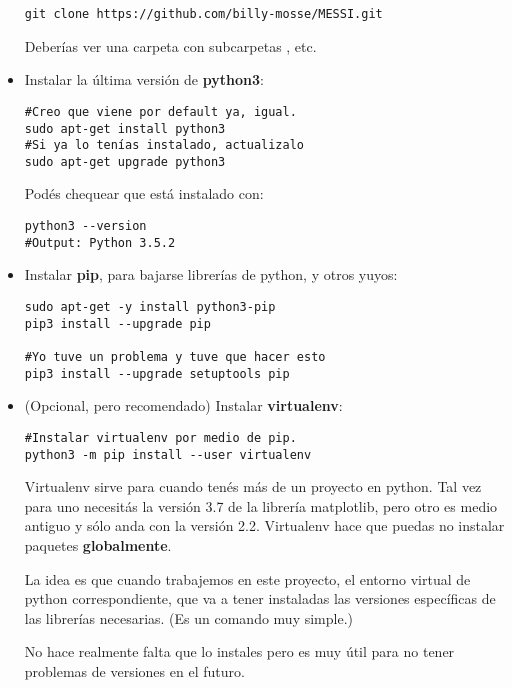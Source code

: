 \documentclass[10pt,a4paper]{report}
\begin{document}
\begin{itemize}
\begin{lstlisting}
git clone https://github.com/billy-mosse/MESSI.git
\end{lstlisting}

Deberías ver una carpeta  con subcarpetas , etc.

\item Instalar la última versión de \textbf{python3}:

\begin{lstlisting}
#Creo que viene por default ya, igual.
sudo apt-get install python3
#Si ya lo tenías instalado, actualizalo
sudo apt-get upgrade python3
\end{lstlisting}

Podés chequear que está instalado con:

\begin{lstlisting}
python3 --version
#Output: Python 3.5.2
\end{lstlisting}

\item Instalar \textbf{pip}, para bajarse librerías de python, y otros yuyos:

\begin{lstlisting}
sudo apt-get -y install python3-pip
pip3 install --upgrade pip

#Yo tuve un problema y tuve que hacer esto
pip3 install --upgrade setuptools pip
\end{lstlisting}

\item (Opcional, pero recomendado) Instalar \textbf{virtualenv}:

\begin{lstlisting}
#Instalar virtualenv por medio de pip.
python3 -m pip install --user virtualenv
\end{lstlisting}

Virtualenv sirve para cuando tenés más de un proyecto en python. Tal vez para uno necesitás la versión 3.7 de la librería matplotlib, pero otro es medio antiguo y sólo anda con la versión 2.2. Virtualenv hace que puedas no instalar paquetes \textbf{globalmente}.

La idea es que cuando trabajemos en este proyecto,  el entorno virtual de python correspondiente, que va a tener instaladas las versiones específicas de las librerías necesarias. (Es un comando muy simple.)

No hace realmente falta que lo instales pero es muy útil para no tener problemas de versiones en el futuro.


\end{itemize}
\end{document}
